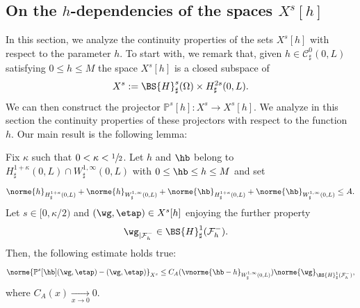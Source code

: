 \subsection{On the $h$-dependencies of the spaces $X^s[h]$}
\label{continuite_h}
In this section, we analyze the continuity properties of the sets $X^s[h]$ with respect to the parameter $h$.
To start with, we remark that, given $h \in \mathcal{C}^0_{\sharp}(0,L)$ satisfying $0 \leq h \leq M$ the space
$X^s[h]$ is a closed subspace of
\[
X^s := \BS{H}^s_{\sharp}(\Omega) \times H^{2s}_{\sharp}(0,L).
\]
We can then construct the projector $\mathbb P^s[h] : X^s \to X^s[h]$. We analyze in this section the continuity
properties of these projectors with respect to the function $h$. Our main result is the following lemma:

\begin{lemma} \label{lem:projector}
Fix $\kappa$ such that $0<\kappa<\sfrac{1}{2}$. Let $h$ and $\hb$ belong to $H_\sharp^{1+\kappa}(0,L)\cap W_\sharp^{1,\infty}(0,L)$ with $0\leq \hb\leq h\leq M$ and set
\begin{equation}
\label{borne:A}\norme{h}_{H^{1+\kappa}_{\sharp}(0,L)}+\norme{h}_{W^{1,\infty}_{\sharp}(0,L)}+\norme{\hb}_{H^{1+\kappa}_{\sharp}(0,L)}+\norme{\hb}_{W^{1,\infty}_{\sharp}(0,L)}\leq A.
\end{equation}
Let $s \in [0,\kappa/2)$ and $(\wg,\etap) \in X^s[h]$ enjoying the further property
\begin{eqnarray}
&\wg_{\vert\mathcal{F}_{h}^{-}}\in \BS{H}^{1}_{\sharp}(\mathcal{F}^{-}_{h}).\label{hyp-Ps2}
\end{eqnarray}
Then, the following estimate holds true:
\begin{equation}\label{est.projector.main}
\norme{\mathbb{P}^{s}[\hb](\wg,\etap) -(\wg,\etap)}_{X^s}\leq C_{A}(\vnorme{\hb -h }_{W^{1,\infty}_{\sharp}(0,L)})\norme{\wg}_{\BS{H}^{1}_{\sharp}(\mathcal{F}^{-}_{h})},
\end{equation}
where $C_{A}(x)\underset{x\to 0}{\to}0$.
\end{lemma}

